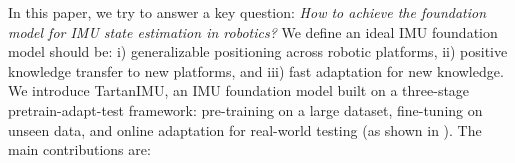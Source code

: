 


In this paper, we try to answer a key question: \textit{How to achieve the foundation model for IMU state estimation in robotics?}
We define an ideal IMU foundation model should be: i) generalizable positioning across robotic platforms, ii) positive knowledge transfer to new platforms, and iii) fast adaptation for new knowledge.
We introduce TartanIMU, an IMU foundation model built on a three-stage pretrain-adapt-test framework: pre-training on a large dataset, fine-tuning on unseen data, and online adaptation for real-world testing (as shown in ). The main contributions are:

